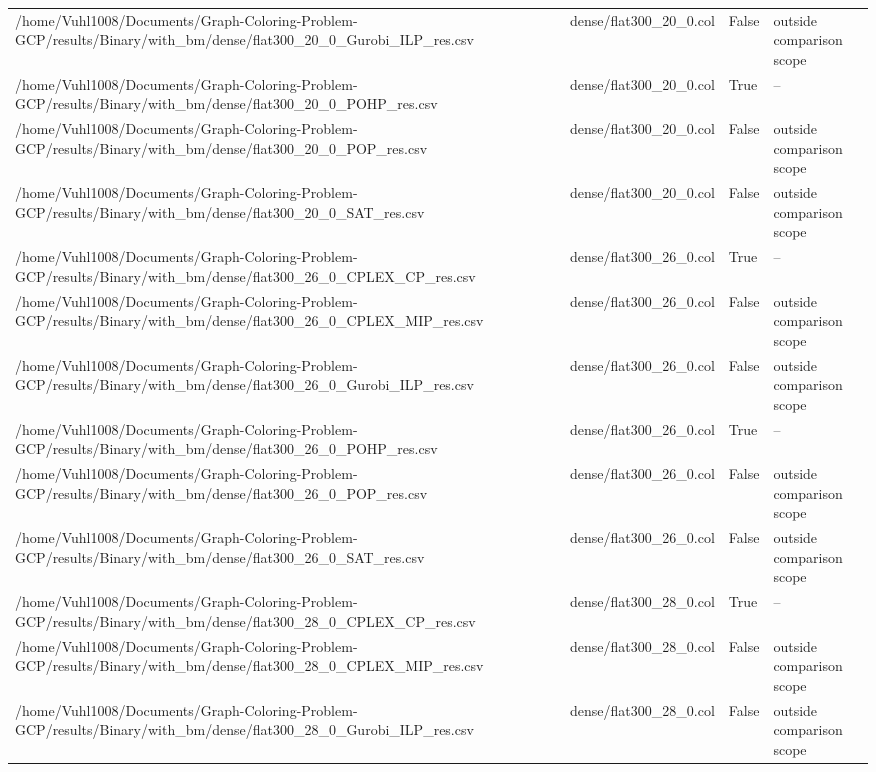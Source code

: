 \begin{table}[htbp]
\begin{tabular}{llll}
/home/Vuhl1008/Documents/Graph-Coloring-Problem-GCP/results/Binary/with\_bm/dense/flat300\_20\_0\_Gurobi\_ILP\_res.csv & dense/flat300\_20\_0.col & False & outside comparison scope \\
/home/Vuhl1008/Documents/Graph-Coloring-Problem-GCP/results/Binary/with\_bm/dense/flat300\_20\_0\_POHP\_res.csv & dense/flat300\_20\_0.col & True & -- \\
/home/Vuhl1008/Documents/Graph-Coloring-Problem-GCP/results/Binary/with\_bm/dense/flat300\_20\_0\_POP\_res.csv & dense/flat300\_20\_0.col & False & outside comparison scope \\
/home/Vuhl1008/Documents/Graph-Coloring-Problem-GCP/results/Binary/with\_bm/dense/flat300\_20\_0\_SAT\_res.csv & dense/flat300\_20\_0.col & False & outside comparison scope \\
/home/Vuhl1008/Documents/Graph-Coloring-Problem-GCP/results/Binary/with\_bm/dense/flat300\_26\_0\_CPLEX\_CP\_res.csv & dense/flat300\_26\_0.col & True & -- \\
/home/Vuhl1008/Documents/Graph-Coloring-Problem-GCP/results/Binary/with\_bm/dense/flat300\_26\_0\_CPLEX\_MIP\_res.csv & dense/flat300\_26\_0.col & False & outside comparison scope \\
/home/Vuhl1008/Documents/Graph-Coloring-Problem-GCP/results/Binary/with\_bm/dense/flat300\_26\_0\_Gurobi\_ILP\_res.csv & dense/flat300\_26\_0.col & False & outside comparison scope \\
/home/Vuhl1008/Documents/Graph-Coloring-Problem-GCP/results/Binary/with\_bm/dense/flat300\_26\_0\_POHP\_res.csv & dense/flat300\_26\_0.col & True & -- \\
/home/Vuhl1008/Documents/Graph-Coloring-Problem-GCP/results/Binary/with\_bm/dense/flat300\_26\_0\_POP\_res.csv & dense/flat300\_26\_0.col & False & outside comparison scope \\
/home/Vuhl1008/Documents/Graph-Coloring-Problem-GCP/results/Binary/with\_bm/dense/flat300\_26\_0\_SAT\_res.csv & dense/flat300\_26\_0.col & False & outside comparison scope \\
/home/Vuhl1008/Documents/Graph-Coloring-Problem-GCP/results/Binary/with\_bm/dense/flat300\_28\_0\_CPLEX\_CP\_res.csv & dense/flat300\_28\_0.col & True & -- \\
/home/Vuhl1008/Documents/Graph-Coloring-Problem-GCP/results/Binary/with\_bm/dense/flat300\_28\_0\_CPLEX\_MIP\_res.csv & dense/flat300\_28\_0.col & False & outside comparison scope \\
/home/Vuhl1008/Documents/Graph-Coloring-Problem-GCP/results/Binary/with\_bm/dense/flat300\_28\_0\_Gurobi\_ILP\_res.csv & dense/flat300\_28\_0.col & False & outside comparison scope \\

\end{tabular}
\end{table}
